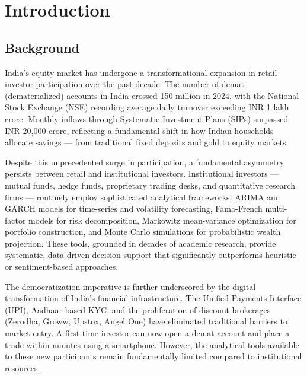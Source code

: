 \documentclass[12pt, a4paper, oneside]{report}
\begin{document}
\newpage
{}

\chapter{Introduction}
\label{chap:introduction}

\section{Background}
\label{sec:background}

India's equity market has undergone a transformational expansion in retail investor participation over the past decade. The number of demat (dematerialized) accounts in India crossed 150 million in 2024, with the National Stock Exchange (NSE) recording average daily turnover exceeding INR 1 lakh crore. Monthly inflows through Systematic Investment Plans (SIPs) surpassed INR 20,000 crore, reflecting a fundamental shift in how Indian households allocate savings --- from traditional fixed deposits and gold to equity markets.

Despite this unprecedented surge in participation, a fundamental asymmetry persists between retail and institutional investors. Institutional investors --- mutual funds, hedge funds, proprietary trading desks, and quantitative research firms --- routinely employ sophisticated analytical frameworks: ARIMA and GARCH models for time-series and volatility forecasting, Fama-French multi-factor models for risk decomposition, Markowitz mean-variance optimization for portfolio construction, and Monte Carlo simulations for probabilistic wealth projection. These tools, grounded in decades of academic research, provide systematic, data-driven decision support that significantly outperforms heuristic or sentiment-based approaches.

The democratization imperative is further underscored by the digital transformation of India's financial infrastructure. The Unified Payments Interface (UPI), Aadhaar-based KYC, and the proliferation of discount brokerages (Zerodha, Groww, Upstox, Angel One) have eliminated traditional barriers to market entry. A first-time investor can now open a demat account and place a trade within minutes using a smartphone. However, the analytical tools available to these new participants remain fundamentally limited compared to institutional resources.
\end{document}
